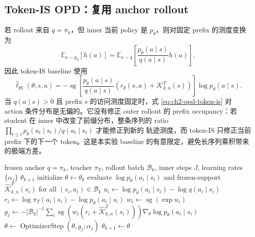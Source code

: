 \subsection{Token-IS OPD：复用 anchor rollout}
\label{subsec:ch2-opd-is-baseline}

若 rollout 来自 $q=\pi_k$，但 inner 当前 policy 是 $p_\theta$，则对固定 prefix
的测度变换为
\begin{equation}
\label{eq:ch2-opd-token-is}
\mathbb E_{a\sim p_\theta}[h(a)]
 =\mathbb E_{a\sim q}
 \left[\frac{p_\theta(a\mid s)}{q(a\mid s)}h(a)\right].
\end{equation}
因此 token-IS baseline 使用
\begin{equation}
\widehat\ell_{\mathrm{IS}}(\theta;s,a)
 =-\operatorname{sg}\!\left[
 \frac{p_\theta(a\mid s)}{q(a\mid s)}
 \left(r_\theta(s,a)+\mathcal K_{k,n}^{T}(s)\right)\right]
 \log p_\theta(a\mid s).
\end{equation}
当 $q(a\mid s)>0$ 且 prefix $s$ 的访问测度固定时，式
\eqref{eq:ch2-opd-token-is} 对 action 条件分布是无偏的。它没有修正 outer
rollout 的 prefix occupancy：若 student 在 inner 中改变了前缀分布，整条序列的
ratio $\prod_{t\leq l}p_\theta(a_t\mid s_t)/q(a_t\mid s_t)$ 才能修正到新的
轨迹测度，而 token-IS 只修正当前 prefix 下的下一个 token。这是本实验 baseline
的有意限定，避免长序列乘积带来的极端方差。

\begin{algorithm}[ht]
\caption{Token-IS OPD baseline\\{\small\textit{Semantics: 复用 anchor rollout；仅修正 prefix 条件下的 token 测度}}}
\begin{algorithmic}[1]
\Require frozen anchor $q=\pi_k$, teacher $\pi_T$, rollout batch $\mathcal B_k$, inner steps $J$, learning rates $\{\alpha_j\}$
\Ensure $\theta_{k+1}$
\State initialize $\theta\gets\theta_k$
    \State evaluate $\log p_\theta(a_i\mid s_i)$ and frozen-support $\widehat{\mathcal K}_{k,n}^{T}(s_i)$ for all $(s_i,a_i)\in\mathcal B_k$
    \State $u_i\gets\log p_\theta(a_i\mid s_i)-\log q(a_i\mid s_i)$
    \State $r_i\gets\log\pi_T(a_i\mid s_i)-\log p_\theta(a_i\mid s_i)$
    \State $w_i\gets\operatorname{sg}(\exp u_i)$
    \State $g_j\gets-|\mathcal B_k|^{-1}\sum_i\operatorname{sg}(w_i(r_i+\widehat{\mathcal K}_{k,n}^{T}(s_i)))\nabla_\theta\log p_\theta(a_i\mid s_i)$
    \State $\theta\gets\operatorname{OptimizerStep}(\theta,g_j;\alpha_j)$
\EndFor
\State \Return $\theta_{k+1}\gets\theta$
\end{algorithmic}
\end{algorithm}

